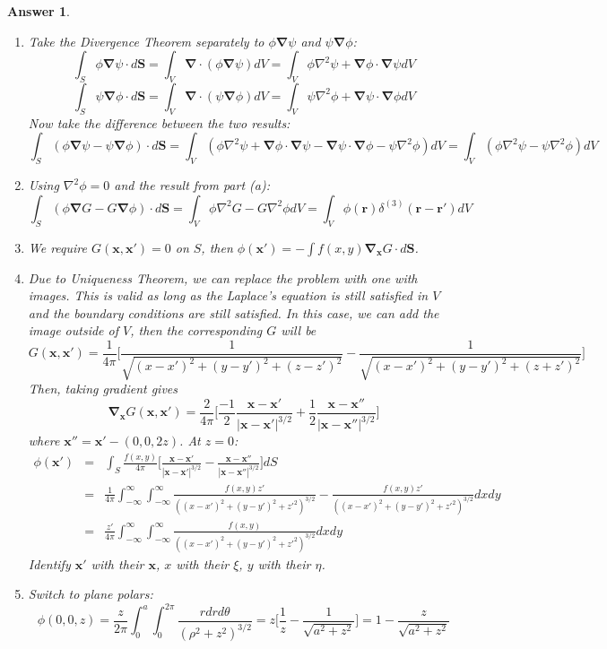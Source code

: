 \documentclass[a4paper]{article}
\newtheorem{ans}{Answer}[section]
\theoremstyle{new}
\begin{document}
\begin{ans}\leavevmode
\begin{enumerate}[label=(\alph*)]
\item Take the Divergence Theorem separately to $\phi\boldsymbol{\nabla}\psi$ and $\psi\boldsymbol{\nabla}\phi$:
$$\int_S\phi\boldsymbol{\nabla}\psi\cdot d\mathbf{S}=\int_V\boldsymbol{\nabla}\cdot(\phi\boldsymbol{\nabla}\psi)dV=\int_V\phi\nabla^2\psi+\boldsymbol{\nabla}\phi\cdot\boldsymbol{\nabla}\psi dV$$
$$\int_S\psi\boldsymbol{\nabla}\phi\cdot d\mathbf{S}=\int_V\boldsymbol{\nabla}\cdot(\psi\boldsymbol{\nabla}\phi)dV=\int_V\psi\nabla^2\phi+\boldsymbol{\nabla}\psi\cdot\boldsymbol{\nabla}\phi dV$$
Now take the difference between the two results:
$$\int_S(\phi\boldsymbol{\nabla}\psi-\psi\boldsymbol{\nabla}\phi)\cdot d\mathbf{S}=\int_V(\phi\nabla^2\psi+\boldsymbol{\nabla}\phi\cdot \boldsymbol{\nabla}\psi-\boldsymbol{\nabla}\psi\cdot\boldsymbol{\nabla}\phi-\psi\nabla^2\phi)dV=\int_V(\phi\nabla^2\psi-\psi\nabla^2\phi)dV$$
\item Using $\nabla^2\phi=0$ and the result from part (a):
$$\int_S(\phi\boldsymbol{\nabla} G-G\boldsymbol{\nabla}\phi)\cdot d\mathbf{S}=\int_V\phi\nabla^2G-G\nabla^2\phi dV=\int_V\phi(\mathbf{r})\delta^{(3)}(\mathbf{r}-\mathbf{r'})dV$$
\item We require $G(\mathbf{x},\mathbf{x'})=0$ on $S$, then $\phi(\mathbf{x'})=-\int f(x,y)\boldsymbol{\nabla_x}G\cdot d\mathbf{S}$.
\item Due to Uniqueness Theorem, we can replace the problem with one with images. This is valid as long as the Laplace's equation is still satisfied in $V$ and the boundary conditions are still satisfied. In this case, we can add the image outside of $V$, then the corresponding $G$ will be
$$G(\mathbf{x},\mathbf{x'})=\frac{1}{4\pi}\bigg[\frac{1}{\sqrt{(x-x')^2+(y-y')^2+(z-z')^2}}-\frac{1}{\sqrt{(x-x')^2+(y-y')^2+(z+z')^2}}\bigg]$$
Then, taking gradient gives
$$\boldsymbol{\nabla_x}G(\mathbf{x},\mathbf{x'})=\frac{2}{4\pi}\bigg[\frac{-1}{2}\frac{\mathbf{x}-\mathbf{x'}}{|\mathbf{x}-\mathbf{x'}|^{3/2}}+\frac{1}{2}\frac{\mathbf{x}-\mathbf{x''}}{|\mathbf{x}-\mathbf{x''}|^{3/2}}\bigg]$$
where $\mathbf{x''}=\mathbf{x'}-(0,0,2z)$. At $z=0$:
\begin{eqnarray}
\phi(\mathbf{x'})&=&\int_S\frac{f(x,y)}{4\pi}\bigg[\frac{\mathbf{x}-\mathbf{x'}}{|\mathbf{x}-\mathbf{x'}|^{3/2}}-\frac{\mathbf{x}-\mathbf{x''}}{|\mathbf{x}-\mathbf{x''}|^{3/2}}\bigg]dS\nonumber\\&=&\frac{1}{4\pi}\int_{-\infty}^\infty\int_{-\infty}^\infty\frac{f(x,y)z'}{((x-x')^2+(y-y')^2+z'^2)^{3/2}}-\frac{f(x,y)z'}{((x-x')^2+(y-y')^2+z'^2)^{3/2}}dxdy\nonumber\\&=&\frac{z'}{4\pi}\int_{-\infty}^\infty\int_{-\infty}^\infty\frac{f(x,y)}{((x-x')^2+(y-y')^2+z'^2)^{3/2}}dxdy\nonumber
\end{eqnarray}
Identify $\mathbf{x'}$ with their $\mathbf{x}$, $x$ with their $\xi$, $y$ with their $\eta$.
\item Switch to plane polars:
$$\phi(0,0,z)=\frac{z}{2\pi}\int_0^a\int_0^{2\pi}\frac{rdrd\theta}{(\rho^2+z^2)^{3/2}}=z\bigg[\frac{1}{z}-\frac{1}{\sqrt{a^2+z^2}}\bigg]=1-\frac{z}{\sqrt{a^2+z^2}}$$
\end{enumerate}
\end{ans}
\end{document}
